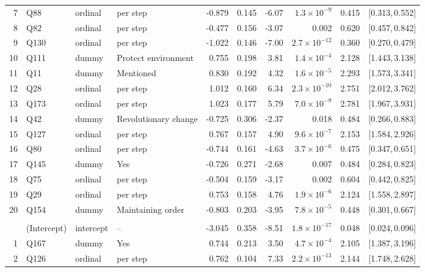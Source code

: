 \begin{landscape}
\begin{longtable}{r l l l r r r r r c}
7 & Q88 & ordinal & per step & -0.879 & 0.145 & -6.07 & $1.3{\times}10^{-9}$ & 0.415 & [0.313,\,0.552] &  \\
8 & Q82 & ordinal & per step & -0.477 & 0.156 & -3.07 & 0.002 & 0.620 & [0.457,\,0.842] &  \\
9 & Q130 & ordinal & per step & -1.022 & 0.146 & -7.00 & $2.7{\times}10^{-12}$ & 0.360 & [0.270,\,0.479] &  \\
10 & Q111 & dummy & Protect environment & 0.755 & 0.198 & 3.81 & $1.4{\times}10^{-4}$ & 2.128 & [1.443,\,3.138] &  \\
11 & Q11 & dummy & Mentioned & 0.830 & 0.192 & 4.32 & $1.6{\times}10^{-5}$ & 2.293 & [1.573,\,3.341] &  \\
12 & Q28 & ordinal & per step & 1.012 & 0.160 & 6.34 & $2.3{\times}10^{-10}$ & 2.751 & [2.012,\,3.762] &  \\
13 & Q173 & ordinal & per step & 1.023 & 0.177 & 5.79 & $7.0{\times}10^{-9}$ & 2.781 & [1.967,\,3.931] &  \\
14 & Q42 & dummy & Revolutionary change & -0.725 & 0.306 & -2.37 & 0.018 & 0.484 & [0.266,\,0.883] &  \\
15 & Q127 & ordinal & per step & 0.767 & 0.157 & 4.90 & $9.6{\times}10^{-7}$ & 2.153 & [1.584,\,2.926] &  \\
16 & Q80 & ordinal & per step & -0.744 & 0.161 & -4.63 & $3.7{\times}10^{-6}$ & 0.475 & [0.347,\,0.651] &  \\
17 & Q145 & dummy & Yes & -0.726 & 0.271 & -2.68 & 0.007 & 0.484 & [0.284,\,0.823] &  \\
18 & Q75 & ordinal & per step & -0.504 & 0.159 & -3.17 & 0.002 & 0.604 & [0.442,\,0.825] &  \\
19 & Q29 & ordinal & per step & 0.753 & 0.158 & 4.76 & $1.9{\times}10^{-6}$ & 2.124 & [1.558,\,2.897] &  \\
20 & Q154 & dummy & Maintaining order & -0.803 & 0.203 & -3.95 & $7.8{\times}10^{-5}$ & 0.448 & [0.301,\,0.667] &  \\
\addlinespace[4pt]
\multicolumn{9}{l}{\textbf{Cluster 3} \quad \small $n = 2579$ ($n_{\text{in}} = 1012$), AIC $= 1629.3$, residual deviance $= 1587.3$ on 2558 df}\\[2pt]
 & (Intercept) & intercept & -- & -3.045 & 0.358 & -8.51 & $1.8{\times}10^{-17}$ & 0.048 & [0.024,\,0.096] &  \\
1 & Q167 & dummy & Yes & 0.744 & 0.213 & 3.50 & $4.7{\times}10^{-4}$ & 2.105 & [1.387,\,3.196] &  \\
2 & Q126 & ordinal & per step & 0.762 & 0.104 & 7.33 & $2.2{\times}10^{-13}$ & 2.144 & [1.748,\,2.628] &  \\

\end{longtable}
\end{landscape}
